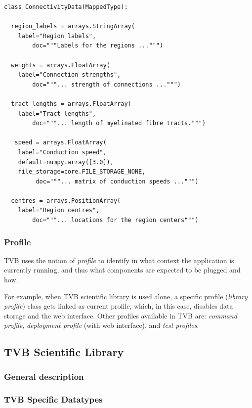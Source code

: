 \begin{lstlisting}
class ConnectivityData(MappedType):

  region_labels = arrays.StringArray( 
	label="Region labels", 
        doc="""Labels for the regions ...""")

  weights = arrays.FloatArray( 
	label="Connection strengths",
        doc="""... strength of connections ...""")

  tract_lengths = arrays.FloatArray( 
	label="Tract lengths",
        doc="""... length of myelinated fibre tracts.""")

   speed = arrays.FloatArray( 
	label="Conduction speed", 
	default=numpy.array([3.0]), 
	file_storage=core.FILE_STORAGE_NONE,
         doc="""... matrix of conduction speeds ...""")

  centres = arrays.PositionArray( 
	label="Region centres",
        doc="""... locations for the region centers""")
\end{lstlisting}

	\subsubsection{Profile}

TVB uses the notion of \emph{profile} to identify in what context the application is currently running,
and thus what components are expected to be plugged and how.

For example, when TVB scientific library is used alone, a specific profile (\emph{library profile}) class 
gets linked as current profile, which, in this case, disables data storage and the web interface. Other profiles available
in TVB are: \emph{command profile}, \emph{deployment profile} (with web interface), and \emph{test profiles}.

	\subsection{TVB Scientific Library}

	\subsubsection{General description}

	\subsubsection{TVB Specific Datatypes}


